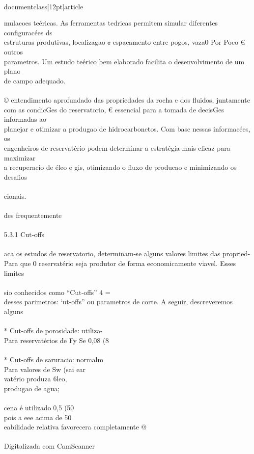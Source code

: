 \\documentclass[12pt]{article}
\begin{document}
mulacoes teéricas. As ferramentas tedricas permitem simular diferentes configuracées ds\\
estruturas produtivas, localizagao ¢ espacamento entre pogos, vaza0 Por Poco € outros\\
parametros. Um estudo teérico bem elaborado facilita o desenvolvimento de um plano\\
de campo adequado.\\
\\
© entendimento aprofundado das propriedades da rocha e dos fluidos, juntamente\\
com as condicGes do reservatorio, € essencial para a tomada de decisGes informadas ao\\
planejar e otimizar a produgao de hidrocarbonetos. Com base nessas informacées, os\\
engenheiros de reservatério podem determinar a estratégia mais eficaz para maximizar\\
a recuperacio de éleo e gis, otimizando o fluxo de producao e minimizando os desafios\\
\\
cionais.\\
\\
des frequentemente\\
\\
5.3.1 Cut-offs\\
\\
aca os estudos de reservatorio, determinam-se alguns valores limites das propried-\\
Para que 0 reservatério seja produtor de forma economicamente viavel. Esses limites\\
\\
sio conhecidos como “Cut-offs” 4 =\\
desses parimetros: ‘ut-offs” ou parametros de corte. A seguir, descreveremos alguns\\
\\
* Cut-offs de porosidade: utiliza-\\
Para reservatérios de Fy Se 0,08 (8\\%
\\
* Cut-offs de saruracio: normalm\\
Para valores de Sw (sai ear\\
vatério produza 6leo,\\
produgao de agua;\\
\\
cena é utilizado 0,5 (50\\%
pois a eee acima de 50\\%
eabilidade relativa favorecera completamente @\\
\\
Digitalizada com CamScanner\\
\end{document}
